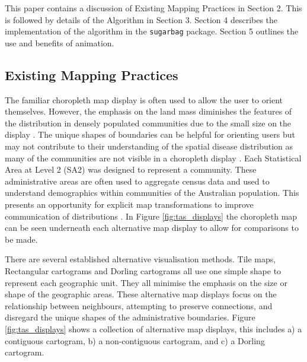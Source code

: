 This paper contains a discussion of Existing Mapping Practices in
Section 2. This is followed by details of the Algorithm in Section 3.
Section 4 describes the implementation of the algorithm in the
\texttt{sugarbag} package. Section 5 outlines the use and benefits of
animation.

\hypertarget{existing-mapping-practices}{%
\subsection{Existing Mapping
Practices}\label{existing-mapping-practices}}

The familiar choropleth map display is often used to allow the user to
orient themselves. However, the emphasis on the land mass diminishes the
features of the distribution in densely populated communities due to the
small size on the display \citep{ACTUC}. The unique shapes of boundaries
can be helpful for orienting users but may not contribute to their
understanding of the spatial disease distribution as many of the
communities are not visible in a choropleth display \citep{TVSSS}. Each
Statistical Area at Level 2 (SA2) \citep{abs2011} was designed to
represent a community. These administrative areas are often used to
aggregate census data and used to understand demographics within
communities of the Australian population. This presents an opportunity
for explicit map transformations to improve communication of
distributions \citep{CBATCC}. In Figure \ref{fig:tas_displays} the
choropleth map can be seen underneath each alternative map display to
allow for comparisons to be made.

There are several established alternative visualisation methods. Tile
maps, Rectangular cartograms \citep{ORC} and Dorling cartograms
\citep{ACTUC} all use one simple shape to represent each geographic
unit. They all minimise the emphasis on the size or shape of the
geographic areas. These alternative map displays focus on the
relationship between neighbours, attempting to preserve connections, and
disregard the unique shapes of the administrative boundaries. Figure
\ref{fig:tas_displays} shows a collection of alternative map displays,
this includes a) a contiguous cartogram, b) a non-contiguous cartogram,
and c) a Dorling cartogram.

